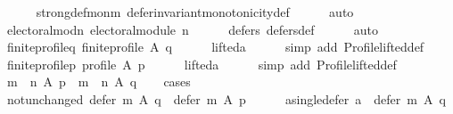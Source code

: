 \begin{isabellebody}
\ \ \ \ \isamarkupfalse%
\ strong{\isacharunderscore}{\kern0pt}def{\isacharunderscore}{\kern0pt}mon{\isacharunderscore}{\kern0pt}m\ defer{\isacharunderscore}{\kern0pt}invariant{\isacharunderscore}{\kern0pt}monotonicity{\isacharunderscore}{\kern0pt}def\isanewline
\ \ \ \ \isamarkupfalse%
\ auto\isanewline
\ \ \isamarkupfalse%
\ electoral{\isacharunderscore}{\kern0pt}mod{\isacharunderscore}{\kern0pt}n{\isacharcolon}{\kern0pt}\ {\isachardoublequoteopen}electoral{\isacharunderscore}{\kern0pt}module\ n{\isachardoublequoteclose}\isanewline
\ \ \ \ \isamarkupfalse%
\ defers{\isacharunderscore}{\kern0pt}{}\ defers{\isacharunderscore}{\kern0pt}def\isanewline
\ \ \ \ \isamarkupfalse%
\ auto\isanewline
\ \ \isamarkupfalse%
\ finite{\isacharunderscore}{\kern0pt}profile{\isacharunderscore}{\kern0pt}q{\isacharcolon}{\kern0pt}\ {\isachardoublequoteopen}finite{\isacharunderscore}{\kern0pt}profile\ A\ q{\isachardoublequoteclose}\isanewline
\ \ \ \ \isamarkupfalse%
\ lifted{\isacharunderscore}{\kern0pt}a\isanewline
\ \ \ \ \isamarkupfalse%
\ {\isacharparenleft}{\kern0pt}simp\ add{\isacharcolon}{\kern0pt}\ Profile{\isachardot}{\kern0pt}lifted{\isacharunderscore}{\kern0pt}def{\isacharparenright}{\kern0pt}\isanewline
\ \ \isamarkupfalse%
\ finite{\isacharunderscore}{\kern0pt}profile{\isacharunderscore}{\kern0pt}p{\isacharcolon}{\kern0pt}\ {\isachardoublequoteopen}profile\ A\ p{\isachardoublequoteclose}\isanewline
\ \ \ \ \isamarkupfalse%
\ lifted{\isacharunderscore}{\kern0pt}a\isanewline
\ \ \ \ \isamarkupfalse%
\ {\isacharparenleft}{\kern0pt}simp\ add{\isacharcolon}{\kern0pt}\ Profile{\isachardot}{\kern0pt}lifted{\isacharunderscore}{\kern0pt}def{\isacharparenright}{\kern0pt}\isanewline
\ \ \isamarkupfalse%
\ {\isachardoublequoteopen}{\isacharparenleft}{\kern0pt}m\ {\isasymtriangleright}\ n{\isacharparenright}{\kern0pt}\ A\ p\ {\isacharequal}{\kern0pt}\ {\isacharparenleft}{\kern0pt}m\ {\isasymtriangleright}\ n{\isacharparenright}{\kern0pt}\ A\ q{\isachardoublequoteclose}\isanewline
\ \ \isamarkupfalse%
\ cases\isanewline
\ \ \ \ \isamarkupfalse%
\ not{\isacharunderscore}{\kern0pt}unchanged{\isacharcolon}{\kern0pt}\ {\isachardoublequoteopen}defer\ m\ A\ q\ {\isasymnoteq}\ defer\ m\ A\ p{\isachardoublequoteclose}\isanewline
\ \ \ \ \isamarkupfalse%
\ a{\isacharunderscore}{\kern0pt}single{\isacharunderscore}{\kern0pt}defer{\isacharcolon}{\kern0pt}\ {\isachardoublequoteopen}{\isacharbraceleft}{\kern0pt}a{\isacharbraceright}{\kern0pt}\ {\isacharequal}{\kern0pt}\ defer\ m\ A\ q{\isachardoublequoteclose}\isanewline

\end{isabellebody}
